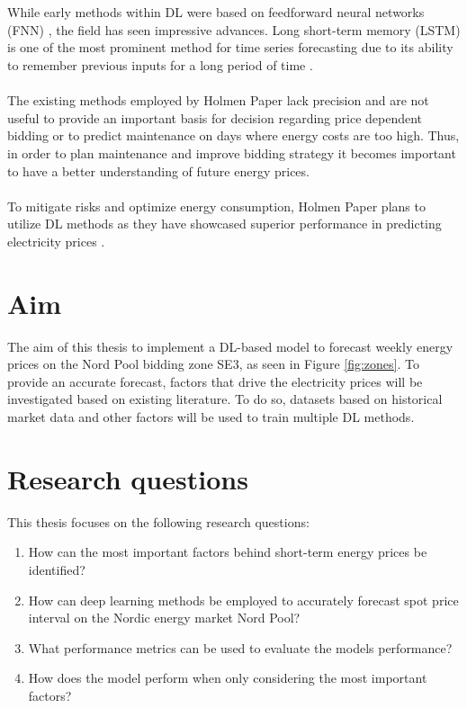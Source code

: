 \\\\
While early methods within DL were based on feedforward neural networks (FNN) \cite{graupe2013principles}, the field has seen impressive advances. Long short-term memory (LSTM) \cite{LSTM} is one of the most prominent method for time series forecasting due to its ability to remember previous inputs for a long period of time \cite{dlorigin}.
\\\\
The existing methods employed by Holmen Paper lack precision and are not useful to provide an important basis for decision regarding price dependent bidding or to predict maintenance on days where energy costs are too high. 
Thus, in order to plan maintenance and improve bidding strategy it becomes important to have a better understanding of future energy prices.
\\\\
To mitigate risks and optimize energy consumption, Holmen Paper plans to utilize DL methods as they have showcased superior performance in predicting electricity prices 
\cite{Jedrzejewski_2022}. 

\section{Aim}
\label{sec:aim}
The aim of this thesis to implement a DL-based model to forecast weekly energy prices on the Nord Pool bidding zone SE3, as seen in Figure \ref{fig:zones}. To provide an accurate forecast, factors that drive the electricity prices will be investigated based on existing literature. To do so, datasets based on historical market data and other factors will be used to train multiple DL methods.

\section{Research questions}
\label{sec:research-questions}

This thesis focuses on the following research questions: 

\begin{enumerate}
\item How can the most important factors behind short-term energy prices be identified?
\item How can deep learning methods be employed to accurately forecast spot price interval on the Nordic energy market Nord Pool? 
\item What performance metrics can be used to evaluate the models performance? 
\item How does the model perform when only considering the most important factors?
\end{enumerate}


